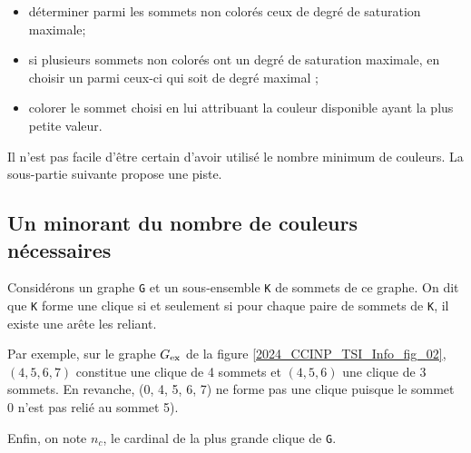 \begin{itemize}
\item déterminer parmi les sommets non colorés ceux de degré de saturation maximale;
\item si plusieurs sommets non colorés ont un degré de saturation maximale, en choisir un parmi ceux-ci qui soit de degré maximal ;
\item colorer le sommet choisi en lui attribuant la couleur disponible ayant la plus petite valeur.
\end{itemize}
\ifprof
\begin{corrige}

\end{corrige}
\else
\fi

Il n'est pas facile d'être certain d'avoir utilisé le nombre minimum de couleurs. La sous-partie suivante propose une piste.


\subsection{Un minorant du nombre de couleurs nécessaires}
Considérons un graphe \lstinline{G} et un sous-ensemble \lstinline{K} de sommets de ce graphe. On dit que \lstinline{K} forme une clique si et seulement si pour chaque paire de sommets de \lstinline{K}, il existe une arête les reliant.

Par exemple, sur le graphe ${G}_{\text{ex}}$ de la figure \ref{2024_CCINP_TSI_Info_fig_02}, $(4, 5, 6, 7)$ constitue une clique de 4 sommets et $(4, 5, 6)$ une clique de 3 sommets. En revanche, (0, 4, 5, 6, 7) ne forme pas une clique puisque le sommet 0 n'est pas relié au sommet 5).

Enfin, on note $n_c$, le cardinal de la plus grande clique de \lstinline{G}.


\ifprof
\begin{corrige}

\end{corrige}
\else
\fi

